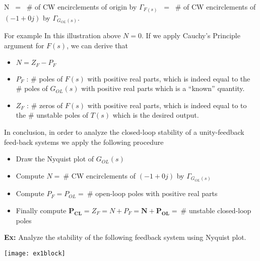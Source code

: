 \documentclass[twoside]{article}
\begin{document}
\vspace{6 pt}

N $\ = \ $ $\#$ of CW encirclements of origin by  $\Gamma_{F(s)}$ $ \ =\ $ $\#$ of
CW encirclements of $(-1 + 0 j)$ by  $\Gamma_{G_{OL}(s)}$. 

\vspace{6 pt}

For example In this illustration above $N =0$. If we apply
Cauchy's Principle argument for $F(s)$, we can derive that
%
\begin{itemize}
  \item $N = Z_F - P_F$ 
%
  \item $P_{F}$ : $\#$ poles of $F(s)$ with positive real parts, which is
    indeed equal to the $\#$ poles of $G_{OL}(s)$ with positive real
    parts which is a ``known'' quantity. 
%
  \item $Z_F$ : $\#$ zeros of $F(s)$ with positive real parts, which is
    indeed equal to to the $\#$ unstable poles of $T(s)$ which is the
   desired output.
\end{itemize}

In conclusion, in order to analyze the closed-loop stability of a 
unity-feedback feed-back systems we apply the following 
procedure 

\begin{itemize}
 \item Draw the Nyquist plot of $G_{OL}(s)$
 \item Compute $N = \ \#$ CW encirclements of $(-1 + 0 j)$ by
   $\Gamma_{G_{OL}(s)}$ 
 \item Compute $P_{F} = P_{OL} = \ \#$ open-loop poles with
   positive real parts
 \item Finally compute $\mathbf{P_{CL}} = Z_{F} = N +  P_F = \mathbf{N +  P_{OL}} = \ \#$
   unstable closed-loop poles  
\end{itemize}

\newpage

\textbf{Ex:} Analyze the stability of the following feedback system
using Nyquist plot.

\vspace{6 pt}

  \begin{minipage}[h]{1\linewidth}
    \begin{center}
      \texttt{[image: ex1block]}
    \end{center}
  \end{minipage}

\vspace{6 pt}
\end{document}
